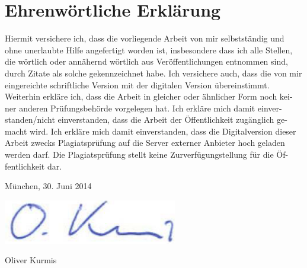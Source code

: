 \newpage
\section*{Ehrenwörtliche Erklärung}  
 
Hiermit  versichere  ich,  dass  die  vorliegende  Arbeit  von  mir  selbstständig  und 
ohne unerlaubte Hilfe angefertigt worden ist, insbesondere dass ich alle Stellen, 
die wörtlich oder annähernd wörtlich aus Veröffentlichungen entnommen sind, 
durch Zitate als solche gekennzeichnet habe. Ich versichere auch, dass die von 
mir  eingereichte  schriftliche  Version  mit  der  digitalen  Version  übereinstimmt. 
Weiterhin erkläre ich, dass die Arbeit in gleicher oder ähnlicher Form noch kei-
ner  anderen  Prüfungsbehörde  vorgelegen  hat.  Ich  erkläre  mich  damit  einver-
standen/nicht  einverstanden,  dass  die  Arbeit  der  Öffentlichkeit  zugänglich  ge-
macht wird. Ich erkläre mich damit einverstanden, dass die Digitalversion dieser 
Arbeit zwecks Plagiatsprüfung auf die Server externer Anbieter hoch geladen 
werden  darf.  Die  Plagiatsprüfung  stellt  keine  Zurverfügungstellung  für  die  Öf-
fentlichkeit dar.
 
München, 30. Juni 2014

\includegraphics[width=.2\textwidth]{img/unterschrift.png}

Oliver Kurmis  